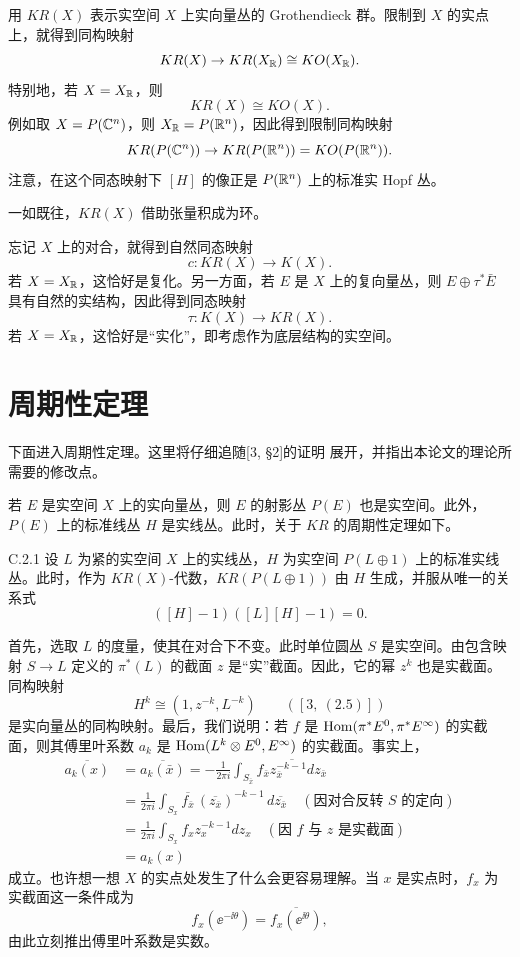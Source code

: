 用 $KR(X)$ 表示实空间 $X$ 上实向量丛的 Grothendieck 群。限制到 $X$ 的实点上，就得到同构映射
\[
KR(X)\to KR(X_{\mathbb{R}})\cong KO(X_{\mathbb{R}}).
\]
特别地，若 $X=X_{\mathbb{R}}$，则
\[
KR(X)\cong KO(X).
\]
例如取 $X=P(\mathbb{C}^n)$，则 $X_{\mathbb{R}}=P(\mathbb{R}^n)$，因此得到限制同构映射
\[
KR(P(\mathbb{C}^n))\to KR(P(\mathbb{R}^n))=KO(P(\mathbb{R}^n)).
\]
注意，在这个同态映射下 $[H]$ 的像正是 $P(\mathbb{R}^n)$ 上的标准实 Hopf 丛。

一如既往，$KR(X)$ 借助张量积成为环。

忘记 $X$ 上的对合，就得到自然同态映射
\[
c\colon KR(X)\to K(X).
\]
若 $X=X_{\mathbb{R}}$，这恰好是复化。另一方面，若 $E$ 是 $X$ 上的复向量丛，则 $E\oplus\tau^*\bar E$ 具有自然的实结构，因此得到同态映射
\[
\tau\colon K(X)\to KR(X).
\]
若 $X=X_{\mathbb{R}}$，这恰好是“实化”，即考虑作为底层结构的实空间。

\section{周期性定理}

下面进入周期性定理。这里将仔细追随[3, §2]的证明
展开，并指出本论文的理论所需要的修改点。

若 $E$ 是实空间 $X$ 上的实向量丛，则 $E$ 的射影丛 $P(E)$ 也是实空间。此外，$P(E)$ 上的标准线丛 $H$ 是实线丛。此时，关于 $KR$ 的周期性定理如下。

\begin{theorem}{C.2.1}
  设 $L$ 为紧的实空间 $X$ 上的实线丛，$H$ 为实空间 $P(L\oplus1)$ 上的标准实线丛。此时，作为 $KR(X)$-代数，$KR(P(L\oplus1))$ 由 $H$ 生成，并服从唯一的关系式
\[
([H]-1)([L][H]-1)=0.
\]
\end{theorem}

首先，选取 $L$ 的度量，使其在对合下不变。此时单位圆丛 $S$ 是实空间。由包含映射 $S\to L$ 定义的 $\pi^*(L)$ 的截面 $z$ 是“实”截面。因此，它的幂 $z^k$ 也是实截面。同构映射
\[
H^k\cong(1,z^{-k},L^{-k})\qquad([3,\ (2.5)])
\]
是实向量丛的同构映射。最后，我们说明：若 $f$ 是 $\operatorname{Hom}(\pi^*E^0,\pi^*E^\infty)$ 的实截面，则其傅里叶系数 $a_k$ 是 $\operatorname{Hom}(L^k\otimes E^0,E^\infty)$ 的实截面。事实上，
\begin{align*}
\overline{a_k(x)}&=\overline{a_k(\bar x)}=-\frac{1}{2\pi i}\int_{S_{\bar x}}\overline{f_{\bar x}z_{\bar x}^{-k-1}dz_{\bar x}}\\
&=\frac{1}{2\pi i}\int_{S_x}\overline{f_{\bar x}}\,(\overline{z_{\bar x}})^{-k-1}\,d\overline{z_{\bar x}}\quad(\text{因对合反转 }S\text{ 的定向})\\
&=\frac{1}{2\pi i}\int_{S_x}f_xz_x^{-k-1}dz_x\quad(\text{因 }f\text{ 与 }z\text{ 是实截面})\\
&=a_k(x)
\end{align*}
成立。也许想一想 $X$ 的实点处发生了什么会更容易理解。当 $x$ 是实点时，$f_x$ 为实截面这一条件成为
\[
f_x(\ee^{-\ii\theta})=\overline{f_x(\ee^{\ii\theta})},
\]
由此立刻推出傅里叶系数是实数。

